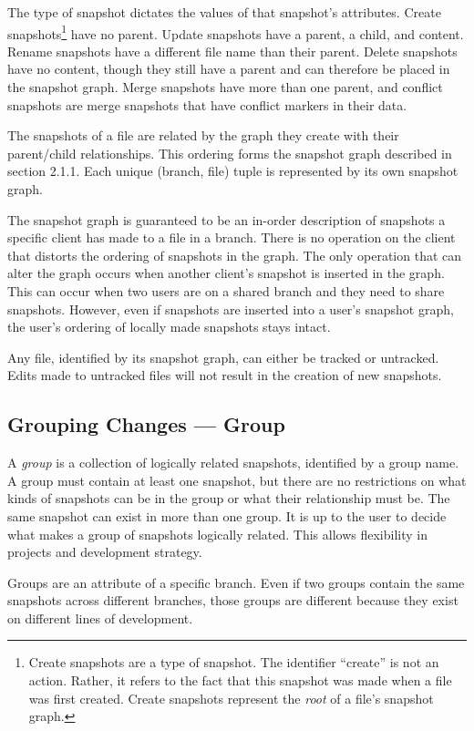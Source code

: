 The type of snapshot dictates the values of that snapshot's attributes. Create snapshots\footnote{Create snapshots are a type of snapshot. The identifier ``create'' is not an action. Rather, it refers to the fact that this snapshot was made when a file was first created. Create snapshots represent the \textit{root} of a file's snapshot graph.} have no parent. Update snapshots have a parent, a child, and content. Rename snapshots have a different file name than their parent. Delete snapshots have no content, though they still have a parent and can therefore be placed in the snapshot graph. Merge snapshots have more than one parent, and conflict snapshots are merge snapshots that have conflict markers in their data.

The snapshots of a file are related by the graph they create with their parent/child relationships. This ordering forms the snapshot graph described in section 2.1.1. Each unique (branch, file) tuple is represented by its own snapshot graph.

The snapshot graph is guaranteed to be an in-order description of snapshots a specific client has made to a file in a branch. There is no operation on the client that distorts the ordering of snapshots in the graph. The only operation that can alter the graph occurs when another client's snapshot is inserted in the graph. This can occur when two users are on a shared branch and they need to share snapshots. However, even if snapshots are inserted into a user's snapshot graph, the user's ordering of locally made snapshots stays intact.

Any file, identified by its snapshot graph, can either be tracked or untracked. Edits made to untracked files will not result in the creation of new snapshots.

\subsection{Grouping Changes --- Group}

A \textit{group} is a collection of logically related snapshots, identified by a group name. A group must contain at least one snapshot, but there are no restrictions on what kinds of snapshots can be in the group or what their relationship must be. The same snapshot can exist in more than one group. It is up to the user to decide what makes a group of snapshots logically related. This allows flexibility in projects and development strategy.

Groups are an attribute of a specific branch. Even if two groups contain the same snapshots across different branches, those groups are different because they exist on different lines of development.

